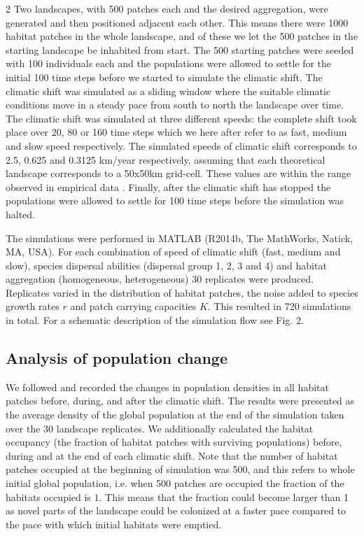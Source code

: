 \documentclass[12pt,pdftex]{article}
\begin{document}
\begin{spacing}{2}
Two landscapes, with 500 patches each and the desired aggregation, were generated and then positioned adjacent each other. This means there were 1000 habitat patches in the whole landscape, and of these we let the 500 patches in the starting landscape be inhabited from start. The 500 starting patches were seeded with 100 individuals each and the populations were allowed to settle for the initial 100 time steps before we started to simulate the climatic shift. The climatic shift was simulated as a sliding window where the suitable climatic conditions move in a steady pace from south to north the landscape over time. The climatic shift was simulated at three different speeds: the complete shift took place over 20, 80 or 160 time steps which we here after refer to as fast, medium and slow speed respectively. The simulated speeds of climatic shift corresponds to 2.5, 0.625 and 0.3125 km/year respectively, assuming that each theoretical landscape  corresponds to a 50x50km grid-cell. These values are within the range observed in empirical data \citep{Loarie2009}.  Finally, after the climatic shift has stopped the populations were allowed to settle for 100 time steps before the simulation was halted.

The simulations were performed in MATLAB (R2014b, The MathWorks, Natick, MA, USA). For each combination of speed of climatic shift (fast, medium and slow), species dispersal abilities (dispersal group 1, 2, 3 and 4) and habitat aggregation (homogeneous, heterogeneous) 30 replicates were produced. Replicates varied in the distribution of habitat patches, the noise added to species growth rates $r$ and patch carrying capacities $K$. This resulted in 720 simulations in total. For a schematic description of the simulation flow see Fig. 2.

\subsection*{Analysis of population change}
We followed and recorded the changes in population densities in all habitat patches before, during, and after the climatic shift. The results were presented as the average density of the global population at the end of the simulation taken over the 30 landscape replicates. We additionally calculated the habitat occupancy (the fraction of habitat patches with surviving populations) before, during and at the end of each climatic shift. Note that the number of habitat patches occupied at the beginning of simulation was 500, and this refers to whole initial global population, i.e. when 500 patches are occupied the fraction of the habitats occupied is $1$. This means that the fraction could become larger than 1 as novel parts of the landscape could be colonized at a faster pace compared to the pace with which initial habitats were emptied. 


\end{spacing}
\end{document}
